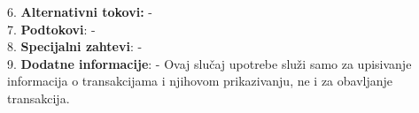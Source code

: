 \documentclass{article}
\begin{document}
6. \textbf{Alternativni tokovi:} -\\

7. \textbf{Podtokovi}:  - \\

8. \textbf{Specijalni zahtevi}: - \\

9. \textbf{Dodatne informacije}: - Ovaj slučaj upotrebe služi samo za upisivanje informacija o transakcijama i njihovom prikazivanju, ne i za obavljanje transakcija. \\
\end{document}

